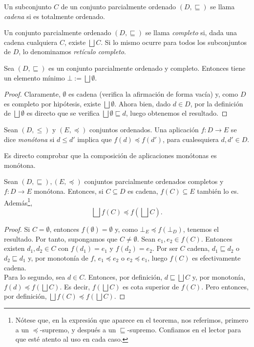 \begin{definition}
Un subconjunto $C$ de un conjunto parcialmente ordenado $(D, \sqsubseteq)$ se llama \textit{cadena} si es totalmente ordenado.
\end{definition}

\begin{definition}
Un conjunto parcialmente ordenado $(D, \sqsubseteq)$ se llama \textit{completo} si, dada una cadena cualquiera $C$, existe $\bigsqcup C$. Si lo mismo ocurre para todos los subconjuntos de $D$, lo denominamos \textit{retículo completo}.
\end{definition}

\begin{prop}
Sea $(D, \sqsubseteq)$ es un conjunto parcialmente ordenado y completo. Entonces tiene un elemento mínimo $\bot := \bigsqcup \emptyset$.
\end{prop}
\begin{proof}
Claramente, $\emptyset$ es cadena (verifica la afirmación de forma vacía) y, como $D$ es completo por hipótesis, existe $\bigsqcup \emptyset$. Ahora bien, dado $d \in D$, por la definición de $\bigsqcup \emptyset$ es directo que se verifica $\bigsqcup\emptyset \sqsubseteq d$, luego obtenemos el resultado.
\end{proof}

\begin{definition}
Sean $(D, \leq)$ y $(E, \preccurlyeq)$ conjuntos ordenados. Una aplicación $f: D \to E$ se dice \textit{monótona} si $d \leq d'$ implica que $f(d) \preccurlyeq f(d')$, para cualesquiera $d, d' \in D$. 
\end{definition}

Es directo comprobar que la composición de aplicaciones monótonas es monótona.

\begin{lema}
Sean $(D, \sqsubseteq), (E, \preccurlyeq)$ conjuntos parcialmente ordenados completos y $f: D \to E$ monótona. Entonces, si $C \subseteq D$ es cadena, $f(C) \subseteq E$ también lo es. Además\footnote{Nótese que, en la expresión que aparece en el teorema, nos referimos, primero a un $\preccurlyeq$-supremo, y después a un $\sqsubseteq$-supremo. Confiamos en el lector para que esté atento al uso en cada caso.},
$$\bigsqcup f(C) \preccurlyeq f\left(\bigsqcup C\right).$$
\end{lema}
\begin{proof}
Si $C = \emptyset$, entonces $f(\emptyset)= \emptyset$ y, como $\bot_E\preccurlyeq f(\bot_D)$, tenemos el resultado. Por tanto, supongamos que $C \neq \emptyset$. Sean $e_1, e_2 \in f(C)$. Entonces existen $d_1, d_2 \in C$ con $f(d_1)=e_1$ y $f(d_2)=e_2$. Por ser $C$ cadena, $d_1 \sqsubseteq d_2$ o $d_2 \sqsubseteq d_1$ y, por monotonía de $f$, $e_1 \preccurlyeq e_2$ o $e_2 \preccurlyeq e_1$, luego $f(C)$ es efectivamente cadena.
\\

Para lo segundo, sea $d \in C$. Entonces, por definición, $d \sqsubseteq \bigsqcup C$ y, por monotonía, $f(d) \preccurlyeq f(\bigsqcup C)$. Es decir, $f(\bigsqcup C)$ es cota superior de $f(C)$. Pero entonces, por definición, $\bigsqcup f(C) \preccurlyeq f(\bigsqcup C)$.
\end{proof}

